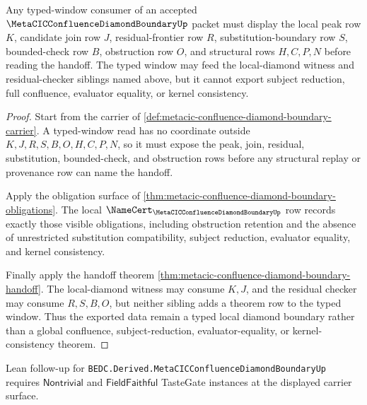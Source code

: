 \begin{theorem}
\label{thm:metacic-confluence-diamond-boundary-typed-window-nonescape}
Any typed-window consumer of an accepted $\MetaCICConfluenceDiamondBoundaryUp$ packet must display the local peak row $K$, candidate join row $J$, residual-frontier row $R$, substitution-boundary row $S$, bounded-check row $B$, obstruction row $O$, and structural rows $H,C,P,N$ before reading the handoff. The typed window may feed the local-diamond witness and residual-checker siblings named above, but it cannot export subject reduction, full confluence, evaluator equality, or kernel consistency.
\end{theorem}
\begin{proof}
Start from the carrier of \autoref{def:metacic-confluence-diamond-boundary-carrier}. A typed-window read has no coordinate outside $K,J,R,S,B,O,H,C,P,N$, so it must expose the peak, join, residual, substitution, bounded-check, and obstruction rows before any structural replay or provenance row can name the handoff.

Apply the obligation surface of \autoref{thm:metacic-confluence-diamond-boundary-obligations}. The local $\NameCert_{\MetaCICConfluenceDiamondBoundaryUp}$ row records exactly those visible obligations, including obstruction retention and the absence of unrestricted substitution compatibility, subject reduction, evaluator equality, and kernel consistency.

Finally apply the handoff theorem \autoref{thm:metacic-confluence-diamond-boundary-handoff}. The local-diamond witness may consume $K,J$, and the residual checker may consume $R,S,B,O$, but neither sibling adds a theorem row to the typed window. Thus the exported data remain a typed local diamond boundary rather than a global confluence, subject-reduction, evaluator-equality, or kernel-consistency theorem.
\end{proof}

Lean follow-up for \texttt{BEDC.Derived.MetaCICConfluenceDiamondBoundaryUp} requires $\mathsf{Nontrivial}$ and $\mathsf{FieldFaithful}$ TasteGate instances at the displayed carrier surface.


